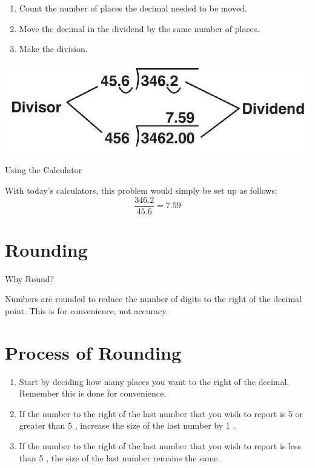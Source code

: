 \documentclass[10pt]{article}
\begin{document}
\begin{enumerate}
  \item Count the number of places the decimal needed to be moved.

  \item Move the decimal in the dividend by the same number of places.

  \item Make the division.

\end{enumerate}
\includegraphics[max width=\textwidth]{2022_09_11_72dbedc910e6e984560cg-12}

Using the Calculator

With today's calculators, this problem would simply be set up as follows:
$$
\frac{346.2}{45.6}=7.59
$$

\section{Rounding}
Why Round?

Numbers are rounded to reduce the number of digits to the right of the decimal point. This is for convenience, not accuracy.

\section{Process of Rounding}
\begin{enumerate}
  \item Start by deciding how many places you want to the right of the decimal. Remember this is done for convenience.

  \item If the number to the right of the last number that you wish to report is 5 or greater than 5 , increase the size of the last number by 1 .

  \item If the number to the right of the last number that you wish to report is less than 5 , the size of the last number remains the same.

\end{enumerate}
\end{document}
